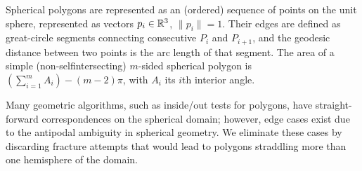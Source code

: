 \documentclass[acmlarge,screen,dvipsnames]{acmart}
\begin{document}
Spherical polygons are represented as an (ordered) sequence of points
on the unit sphere, represented as vectors $p_i\in{\mathbb R}^3$,
$\|p_i\|=1$. Their edges are defined as great-circle segments
connecting consecutive $P_i$ and $P_{i+1}$, and the geodesic distance
between two points is the arc length of that segment. The area of a
simple (non-selfintersecting) $m$-sided spherical polygon is
$(\sum_{i=1}^m A_i) - (m-2)\pi$, with $A_i$ its $i$th interior angle.

Many geometric algorithms, such as inside/out tests for polygons, have
straight-forward correspondences on the spherical domain; however,
edge cases exist due to the antipodal ambiguity in spherical
geometry. We eliminate these cases by discarding fracture attempts
that would lead to polygons straddling more than one hemisphere of the
domain.
\end{document}
